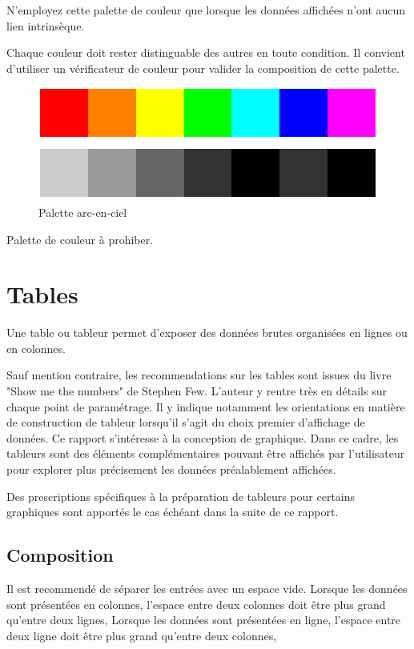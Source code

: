 \documentclass[a4paper,12pt]{article}
\begin{document}
\begin{multicols}{2}
N'employez cette palette de couleur que lorsque les données affichées n'ont aucun lien intrinsèque. \autocite{wilkeColorScales2019}

Chaque couleur doit rester distinguable des autres en toute condition.\autocite{wilkeRedundantCoding2019} Il convient d'utiliser un vérificateur de couleur pour valider la composition de cette palette.\autocite{andreaskrauseBestPracticesData2024}

\begin{figure}[H]
\centering
\includegraphics[width=.9\linewidth]{./img/palette-arc-en-ciel.pdf}
\caption{\label{fig:org012d44b}Palette arc-en-ciel}
\end{figure}

Palette de couleur à prohiber.\autocite{wilkeCommonPitfallsColor2019}
\section*{Tables}
\label{sec:orgefd122d}
Une table ou tableur permet d'exposer des données brutes organisées en lignes ou en colonnes. \autocite{mikeyiHowChooseRight2020}

Sauf mention contraire, les recommendations sur les tables sont issues du livre "Show me the numbers" de Stephen Few.\autocite{stephenfewShowMeNumbers2012} L'auteur y rentre très en détails sur chaque point de paramétrage. Il y indique notamment les orientations en matière de construction de tableur lorsqu'il s'agit du choix premier d'affichage de données. Ce rapport s'intéresse à la conception de graphique. Dans ce cadre, les tableurs sont des éléments complémentaires pouvant être affichés par l'utilisateur pour explorer plus précisement les données préalablement affichées.

Des prescriptions spécifiques à la préparation de tableurs pour certains graphiques sont apportés le cas échéant dans la suite de ce rapport.
\subsection*{Composition}
\label{sec:org8613b95}
Il est recommendé de séparer les entrées avec un espace vide.
Lorsque les données sont présentées en colonnes, l'espace entre deux colonnes doit être plus grand qu'entre deux lignes,
Lorsque les données sont présentées en ligne, l'espace entre deux ligne doit être plus grand qu'entre deux colonnes,


\end{multicols}
\end{document}
